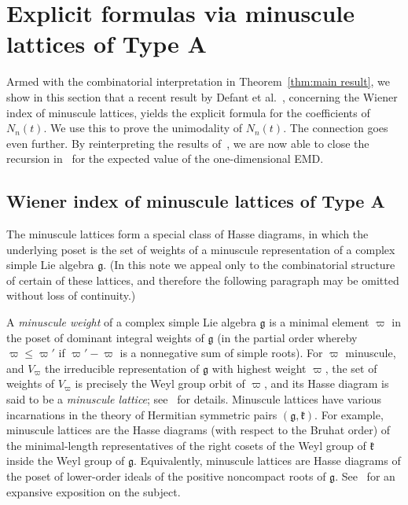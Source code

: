 \documentclass[11pt]{amsart}
\theoremstyle{plain}
\theoremstyle{definition}
\numberwithin{equation}{section}
\begin{document}
\section{Explicit formulas via minuscule lattices of Type A}
\label{sec:Defant}

Armed with the combinatorial interpretation in Theorem~\ref{thm:main result}, we show in this section that a recent result by Defant et al.~\cite{Defant}, concerning the Wiener index of minuscule lattices, yields the explicit formula for the coefficients of $N_n(t)$.
We use this to prove the unimodality of $N_n(t)$.
The connection goes even further.
By reinterpreting the results of~\cite{Defant}, we are now able to close the recursion in~\cite{BW} for the expected value of the one-dimensional EMD.

\subsection{Wiener index of minuscule lattices of Type A}

The minuscule lattices form a special class of Hasse diagrams, in which the underlying poset is the set of weights of a minuscule representation of a complex simple Lie algebra $\mathfrak g$.
(In this note we appeal only to the combinatorial structure of certain of these lattices, and therefore the following paragraph may be omitted without loss of continuity.)

A \emph{minuscule weight} of a complex simple Lie algebra $\mathfrak{g}$ is a minimal element $\varpi$ in the poset of dominant integral weights of $\mathfrak{g}$ (in the partial order whereby $\varpi \leq \varpi'$ if $\varpi' - \varpi$ is a nonnegative sum of simple roots).
For $\varpi$ minuscule, and $V_\varpi$ the irreducible representation of $\mathfrak{g}$ with highest weight $\varpi$, the 
set of weights of $V_{\varpi}$ is precisely the Weyl group orbit of $\varpi$, and its Hasse diagram is said to be a \emph{minuscule lattice}; see~\cite{Proctor} for details.
Minuscule lattices have various incarnations in the theory of Hermitian symmetric pairs $(\mathfrak{g}, \mathfrak{k})$.
For example, minuscule lattices are the Hasse diagrams (with respect to the Bruhat order) of the minimal-length representatives of the right cosets of the Weyl group of $\mathfrak{k}$ inside the Weyl group of $\mathfrak{g}$.
Equivalently, minuscule lattices are Hasse diagrams of the poset of lower-order ideals of the positive noncompact roots of $\mathfrak g$.
See~\cite{EHP} for an expansive exposition on the subject.
\end{document}
